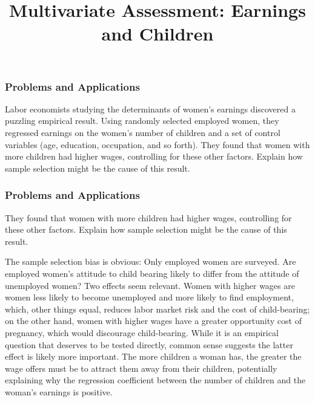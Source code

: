 \title[Multivariate Assessment]{Multivariate Assessment: Earnings and Children}
\date{}







\begin{frame}
\frametitle{Problems and Applications}
Labor economists studying the determinants of women's earnings discovered a puzzling empirical result. Using randomly selected employed women, they regressed earnings on the women's number of children and a set of control variables (age, education, occupation, and so forth). They found that women with more children had higher wages, controlling for these other factors. Explain how sample selection might be the cause of this result. 
\end{frame}


\begin{frame}
\frametitle{Problems and Applications}
They found that women with more children had higher wages, controlling for these other factors. Explain how sample selection might be the cause of this result. \begin{answer}
The sample selection bias is obvious: Only employed women are surveyed. Are employed women's attitude to child bearing likely to differ from the attitude of unemployed women? Two effects seem relevant. Women with higher wages are women less likely to become unemployed and more likely to find employment, which, other things equal, reduces labor market risk and the cost of child-bearing; on the other hand, women with higher wages have a greater opportunity cost of pregnancy, which would discourage child-bearing. While it is an empirical question that deserves to be tested directly, common sense suggests the latter effect is likely more important. The more children a woman has, the greater the wage offers must be to attract them away from their children, potentially explaining why the regression coefficient between the number of children and the woman's earnings is positive.
\end{answer}
\end{frame}



